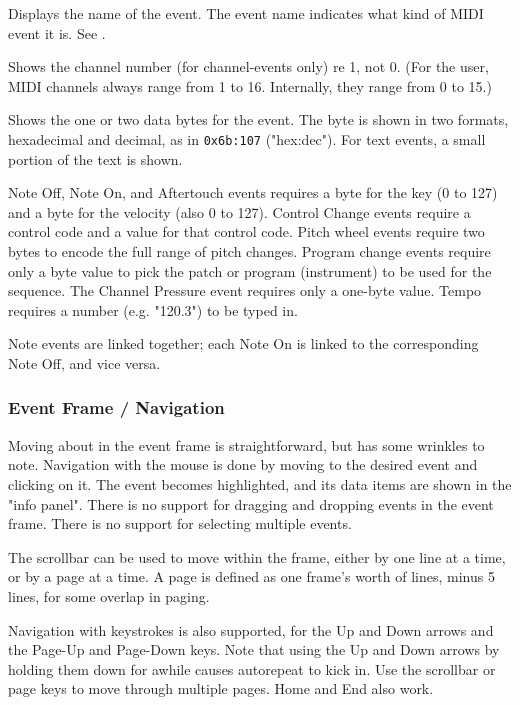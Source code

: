   Displays the name of the event.
   The event name indicates what kind of MIDI event it is. 
   See .

   Shows the channel number (for channel-events only) re 1, not 0.
   (For the user, MIDI channels always range from
   1 to 16.  Internally, they range from 0 to 15.)

   Shows the one or two data bytes for the event.
   The byte is shown in two formats, hexadecimal and decimal, as in
   \texttt{0x6b:107} ("hex:dec").
   For text events, a small portion of the text is shown.

   Note Off, Note On, and Aftertouch events requires a byte for the key (0 to
   127) and a byte for the velocity (also 0 to 127).
   Control Change events require a control code and a value for that control
   code.  Pitch wheel events require two bytes to encode the full range of
   pitch changes.
   Program change events require only a byte value to pick the patch or program
   (instrument) to be used for the sequence.  The Channel Pressure event
   requires only a one-byte value.
   Tempo requires a number (e.g. "120.3") to be typed in.

   Note events are linked together; each Note On is linked to the corresponding
   Note Off, and vice versa.

\subsubsection{Event Frame / Navigation}
\label{subsec:event_frame_navigation}

   Moving about in the event frame is straightforward, but has some
   wrinkles to note.
   Navigation with the mouse is done by moving to the desired event and
   clicking on it.  The event becomes highlighted, and its data items are shown
   in the "info panel".
   There is no support for dragging and dropping events in the event frame.
   There is no support for selecting multiple events.

   The scrollbar can be used to move within the frame, either by one line at a
   time, or by a page at a time.  A page is defined as one frame's worth of
   lines, minus 5 lines, for some overlap in paging.

   Navigation with keystrokes is also supported, for the Up and Down arrows and
   the Page-Up and Page-Down keys.  Note that using the Up and Down arrows by
   holding them down for awhile causes autorepeat to kick in.
   Use the scrollbar or page keys to
   move through multiple pages.  Home and End also work.

